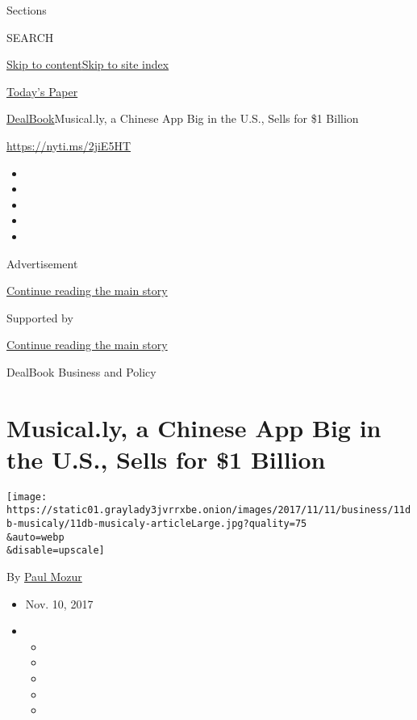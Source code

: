 Sections

SEARCH

\protect\hyperlink{site-content}{Skip to
content}\protect\hyperlink{site-index}{Skip to site index}

\href{https://myaccount.nytimes3xbfgragh.onion/auth/login?response_type=cookie\&client_id=vi}{}

\href{https://www.nytimes3xbfgragh.onion/section/todayspaper}{Today's
Paper}

\href{/section/business/dealbook}{DealBook}\textbar{}Musical.ly, a
Chinese App Big in the U.S., Sells for \$1 Billion

\url{https://nyti.ms/2jiE5HT}

\begin{itemize}
\item
\item
\item
\item
\item
\end{itemize}

Advertisement

\protect\hyperlink{after-top}{Continue reading the main story}

Supported by

\protect\hyperlink{after-sponsor}{Continue reading the main story}

DealBook Business and Policy

\hypertarget{musically-a-chinese-app-big-in-the-us-sells-for-1-billion}{%
\section{Musical.ly, a Chinese App Big in the U.S., Sells for \$1
Billion}\label{musically-a-chinese-app-big-in-the-us-sells-for-1-billion}}

\texttt{[image: https://static01.graylady3jvrrxbe.onion/images/2017/11/11/business/11db-musicaly/11db-musicaly-articleLarge.jpg?quality=75\\\&auto=webp\\\&disable=upscale]}

By \href{https://www.nytimes3xbfgragh.onion/by/paul-mozur}{Paul Mozur}

\begin{itemize}
\item
  Nov. 10, 2017
\item
  \begin{itemize}
  \item
  \item
  \item
  \item
  \item
  \end{itemize}
\end{itemize}

